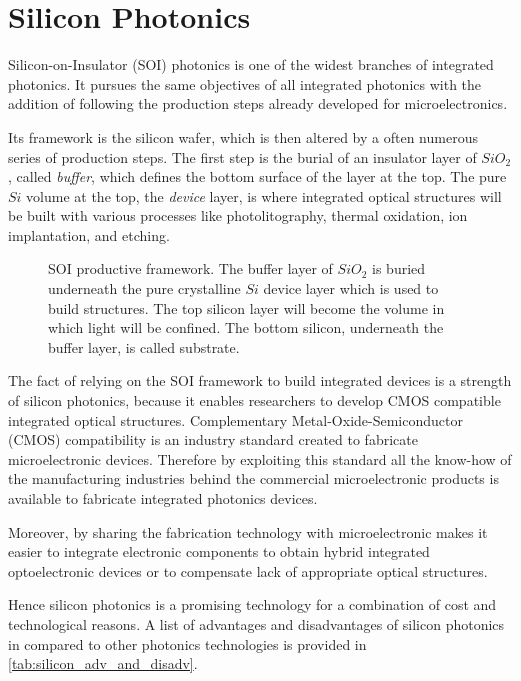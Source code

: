 \section{Silicon Photonics}
\label{sec:Silicon_Photonics}
Silicon-on-Insulator (SOI) photonics is one of the widest branches of integrated photonics.
It pursues the same objectives of all integrated photonics with the addition of following the production steps already developed for microelectronics.

Its framework is the silicon wafer, which is then altered by a often numerous series of production steps.
The first step is the burial of an insulator layer of $SiO_2$, called \textit{buffer}, which defines the bottom surface of the layer at the top.
The pure $Si$ volume at the top, the \textit{device} layer, is where integrated optical structures will be built with various processes like photolitography, thermal oxidation, ion implantation, and etching.

\begin{figure}[ht]
	\centering
	
	\caption{SOI productive framework.
		The buffer layer of $SiO_2$ is buried underneath the pure crystalline $Si$ device layer which is used to build structures.
		The top silicon layer will become the volume in which light will be confined.
		The bottom silicon, underneath the buffer layer, is called substrate.
		}
	\label{fig:SOI}
\end{figure}

The fact of relying on the SOI framework to build integrated devices is a strength of silicon photonics, because it enables researchers to develop CMOS compatible integrated optical structures.
Complementary Metal-Oxide-Semiconductor (CMOS) compatibility is an industry standard created to fabricate microelectronic devices.
Therefore by exploiting this standard all the know-how of the manufacturing industries behind the commercial microelectronic products is available to fabricate integrated photonics devices.

Moreover, by sharing the fabrication technology with microelectronic makes it easier to integrate electronic components to obtain hybrid integrated optoelectronic devices or to compensate lack of appropriate optical structures.

Hence silicon photonics is a promising technology for a combination of cost and technological reasons.
A list of advantages and disadvantages of silicon photonics in compared to other photonics technologies is provided in \autoref{tab:silicon_adv_and_disadv}.

